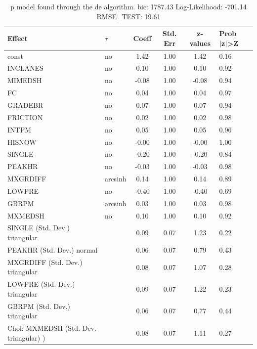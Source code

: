 \begin{table}
	\caption{p model found through the de algorithm. bic: 1787.43 Log-Likelihood: -701.14 RMSE_TEST: 19.61}
	\begin{center}
		\begin{tabular}{|l|l|c|c|c|l|}
			\hline
			Effect & $\tau$ & Coeff & Std. Err & z-values & Prob |z|>Z \\
			\hline
			const & no & 1.42 & 1.00 & 1.42 & 0.16 \\
			\hline
			INCLANES & no & 0.10 & 1.00 & 0.10 & 0.92 \\
			\hline
			MIMEDSH & no & -0.08 & 1.00 & -0.08 & 0.94 \\
			\hline
			FC & no & 0.04 & 1.00 & 0.04 & 0.97 \\
			\hline
			GRADEBR & no & 0.07 & 1.00 & 0.07 & 0.94 \\
			\hline
			FRICTION & no & 0.02 & 1.00 & 0.02 & 0.98 \\
			\hline
			INTPM & no & 0.05 & 1.00 & 0.05 & 0.96 \\
			\hline
			HISNOW & no & -0.00 & 1.00 & -0.00 & 1.00 \\
			\hline
			SINGLE & no & -0.20 & 1.00 & -0.20 & 0.84 \\
			\hline
			PEAKHR & no & -0.03 & 1.00 & -0.03 & 0.98 \\
			\hline
			MXGRDIFF & arcsinh & 0.14 & 1.00 & 0.14 & 0.89 \\
			\hline
			LOWPRE & no & -0.40 & 1.00 & -0.40 & 0.69 \\
			\hline
			GBRPM & arcsinh & 0.03 & 1.00 & 0.03 & 0.98 \\
			\hline
			MXMEDSH & no & 0.10 & 1.00 & 0.10 & 0.92 \\
			\hline
			SINGLE (Std. Dev.) triangular &  & 0.09 & 0.07 & 1.23 & 0.22 \\
			\hline
			PEAKHR (Std. Dev.) normal &  & 0.06 & 0.07 & 0.79 & 0.43 \\
			\hline
			MXGRDIFF (Std. Dev.) triangular &  & 0.08 & 0.07 & 1.07 & 0.28 \\
			\hline
			LOWPRE (Std. Dev.) triangular &  & 0.09 & 0.07 & 1.22 & 0.23 \\
			\hline
			GBRPM (Std. Dev.) triangular &  & 0.06 & 0.07 & 0.77 & 0.44 \\
			\hline
			 Chol: MXMEDSH (Std. Dev. triangular) ) &  & 0.08 & 0.07 & 1.11 & 0.27 \\
			\hline
		\end{tabular}
	\end{center}
\end{table}